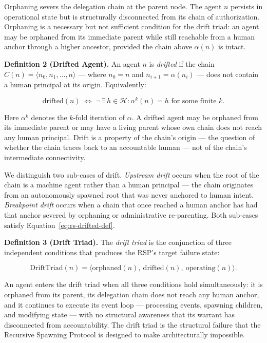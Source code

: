 Orphaning severs the delegation chain at the parent node. The agent $n$ persists in operational state but is structurally disconnected from its chain of authorization. Orphaning is a necessary but not sufficient condition for the drift triad: an agent may be orphaned from its immediate parent while still reachable from a human anchor through a higher ancestor, provided the chain above $\alpha(n)$ is intact.

\medskip
\noindent\textbf{Definition 2 (Drifted Agent).}
An agent $n$ is \emph{drifted} if the chain $C(n) = \langle n_0, n_1, \ldots, n \rangle$ — where $n_0 = n$ and $n_{i+1} = \alpha(n_i)$ — does not contain a human principal at its origin. Equivalently:

\begin{equation}
\mathrm{drifted}(n) \;\iff\; \neg\,\exists\, h \in \mathcal{H} : \alpha^{k}(n) = h \text{ for some finite } k.
\label{eq:rs-drifted-def}
\end{equation}

Here $\alpha^{k}$ denotes the $k$-fold iteration of $\alpha$. A drifted agent may be orphaned from its immediate parent or may have a living parent whose own chain does not reach any human principal. Drift is a property of the chain's origin — the question of whether the chain traces back to an accountable human — not of the chain's intermediate connectivity.

We distinguish two sub-cases of drift. \emph{Upstream drift} occurs when the root of the chain is a machine agent rather than a human principal — the chain originates from an autonomously spawned root that was never anchored to human intent. \emph{Breakpoint drift} occurs when a chain that once reached a human anchor has had that anchor severed by orphaning or administrative re-parenting. Both sub-cases satisfy Equation~\ref{eq:rs-drifted-def}.

\medskip
\noindent\textbf{Definition 3 (Drift Triad).}
The \emph{drift triad} is the conjunction of three independent conditions that produces the RSP's target failure state:

\begin{equation}
\mathrm{DriftTriad}(n) = \langle \mathrm{orphaned}(n),\ \mathrm{drifted}(n),\ \mathrm{operating}(n) \rangle.
\label{eq:rs-drift-triad}
\end{equation}

An agent enters the drift triad when all three conditions hold simultaneously: it is orphaned from its parent, its delegation chain does not reach any human anchor, and it continues to execute its event loop — processing events, spawning children, and modifying state — with no structural awareness that its warrant has disconnected from accountability. The drift triad is the structural failure that the Recursive Spawning Protocol is designed to make architecturally impossible.

